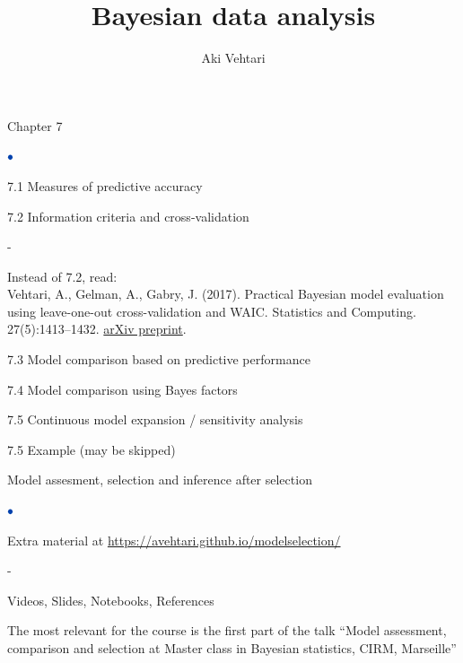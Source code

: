 \documentclass[english,t]{beamer}
\title[]{Bayesian data analysis}
\subtitle{}
\author{Aki Vehtari}
\institute[Aalto]{}
\date[]{}
\newenvironment{list1}{
   \begin{list}{$\color{list1}\bullet$}{\itemsep=6pt}}{
  \end{list}}
\newenvironment{list2}{
  \begin{list}{-}{\baselineskip=12pt\itemsep=2pt}}{
  \end{list}}
\begin{document}
\begin{frame}
  
   {\Large\color{navyblue} Chapter 7}

   \begin{list1}
   \item 7.1 Measures of predictive accuracy
   \item 7.2 Information criteria and cross-validation
     \begin{list2}
     \item Instead of 7.2, read:\\
       Vehtari, A., Gelman, A., Gabry, J. (2017). Practical Bayesian
       model evaluation using leave-one-out cross-validation and
       WAIC. Statistics and Computing. 27(5):1413–1432.
       \href{http://arxiv.org/abs/1507.04544}{arXiv preprint}.
     \end{list2}
   \item 7.3 Model comparison based on predictive performance
   \item 7.4 Model comparison using Bayes factors
   \item 7.5 Continuous model expansion / sensitivity analysis
   \item 7.5 Example (may be skipped)
   \end{list1}

\end{frame}

\begin{frame}
  
   {\Large\color{navyblue} Model assesment, selection and inference after selection}

   \begin{list1}
   \item Extra material at \url{https://avehtari.github.io/modelselection/}
     \begin{list2}
       \item Videos, Slides, Notebooks, References
       \item The most relevant for the course is the first part of the
         talk ``Model assessment, comparison and selection at Master
         class in Bayesian statistics, CIRM, Marseille''
     \end{list2}
   \end{list1}

\end{frame}
 
\end{document}
